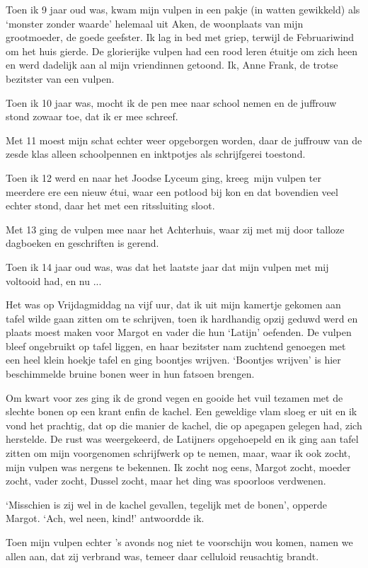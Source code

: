 \documentclass{book}
\begin{document}
Toen ik 9 jaar oud was, kwam mijn vulpen in een pakje (in watten gewikkeld) als
`monster zonder waarde' helemaal uit Aken, de woonplaats van mijn grootmoeder,
de goede geefster. Ik lag in bed met griep, terwijl de Februariwind om het huis
gierde. De glorierijke vulpen had een rood leren étuitje om zich heen en werd
dadelijk aan al mijn vriendinnen getoond. Ik, Anne Frank, de trotse bezitster
van een vulpen.

Toen ik 10 jaar was, mocht ik de pen mee naar school nemen en de juffrouw stond
zowaar toe, dat ik er mee schreef.

Met 11 moest mijn schat echter weer opgeborgen worden, daar de juffrouw van de
zesde klas alleen schoolpennen en inktpotjes als schrijfgerei toestond.

Toen ik 12 werd en naar het Joodse Lyceum ging, kreeg~mijn vulpen ter meerdere
ere een nieuw étui, waar een potlood bij kon en dat bovendien veel echter stond,
daar het met een ritssluiting sloot.

Met 13 ging de vulpen mee naar het Achterhuis, waar zij met mij door talloze
dagboeken en geschriften is gerend.

Toen ik 14 jaar oud was, was dat het laatste jaar dat mijn vulpen met mij
voltooid had, en nu ...

Het was op Vrijdagmiddag na vijf uur, dat ik uit mijn kamertje gekomen aan tafel
wilde gaan zitten om te schrijven, toen ik hardhandig opzij geduwd werd en
plaats moest maken voor Margot en vader die hun `Latijn' oefenden. De vulpen
bleef ongebruikt op tafel liggen, en haar bezitster nam zuchtend genoegen met
een heel klein hoekje tafel en ging boontjes wrijven. `Boontjes wrijven' is hier
beschimmelde bruine bonen weer in hun fatsoen brengen.

Om kwart voor zes ging ik de grond vegen en gooide het vuil tezamen met de
slechte bonen op een krant enfin de kachel. Een geweldige vlam sloeg er uit en
ik vond het prachtig, dat op die manier de kachel, die op apegapen gelegen had,
zich herstelde. De rust was weergekeerd, de Latijners opgehoepeld en ik ging aan
tafel zitten om mijn voorgenomen schrijfwerk op te nemen, maar, waar ik ook
zocht, mijn vulpen was nergens te bekennen. Ik zocht nog eens, Margot zocht,
moeder zocht, vader zocht, Dussel zocht, maar het ding was spoorloos verdwenen.

`Misschien is zij wel in de kachel gevallen, tegelijk met de bonen', opperde
Margot. `Ach, wel neen, kind!' antwoordde ik.

Toen mijn vulpen echter 's avonds nog niet te voorschijn wou komen, namen we
allen aan, dat zij verbrand was, temeer daar celluloid reusachtig brandt.
\end{document}
